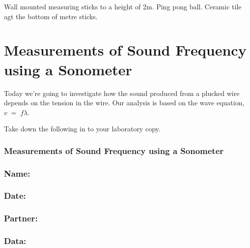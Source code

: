 \documentclass[
  letterpaper,
  DIV=11,
  numbers=noendperiod]{scrreprt}
\begin{document}
Wall mounted measuring sticks to a height of 2m. Ping pong ball. Ceramic
tile agt the bottom of metre sticks.


\chapter{Measurements of Sound Frequency using a
Sonometer}\label{measurements-of-sound-frequency-using-a-sonometer}

Today we're going to investigate how the sound produced from a plucked
wire depends on the tension in the wire. Our analysis is based on the
wave equation, \(v \; = \; f \lambda\).

Take down the following in to your laboratory copy.

\subsection*{\texorpdfstring{{Measurements of Sound Frequency using a
Sonometer}}{Measurements of Sound Frequency using a Sonometer}}\label{measurements-of-sound-frequency-using-a-sonometer-1}

\subsection*{\texorpdfstring{{Name:}}{Name:}}\label{name-6}

\subsection*{\texorpdfstring{{Date:}}{Date:}}\label{date-6}

\subsection*{\texorpdfstring{{Partner:}}{Partner:}}\label{partner-6}

\subsection*{\texorpdfstring{{Data:}}{Data:}}\label{data-6}
\end{document}
